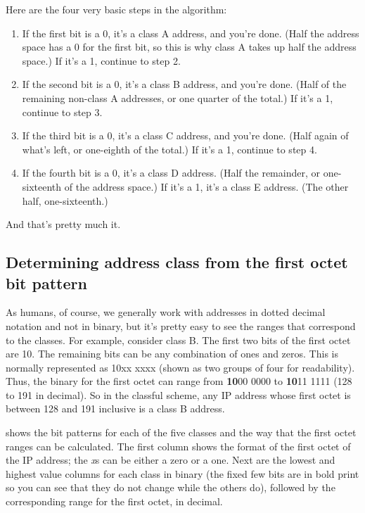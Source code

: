 Here are the four very basic steps in the algorithm:

\begin{enumerate}
   \item
      If the first bit is a 0, it's a class A address, and you're done.
      (Half the address space has a 0 for the first bit, so this is why class A takes up half the address space.)
      If it's a 1, continue to step 2.
   \item
      If the second bit is a 0, it's a class B address, and you're done.
      (Half of the remaining non-class A addresses, or one quarter of the total.)
      If it's a 1, continue to step 3.
   \item
      If the third bit is a 0, it's a class C address, and you're done.
      (Half again of what's left, or one-eighth of the total.) 
      If it's a 1, continue to step 4.
   \item
      If the fourth bit is a 0, it's a class D address.
      (Half the remainder, or one-sixteenth of the address space.) 
      If it's a 1, it's a class E address.
      (The other half, one-sixteenth.)
\end{enumerate}

And that's pretty much it.



\subsection{Determining address class from the first octet bit pattern}

As humans, of course, we generally work with addresses in dotted decimal
notation and not in binary, but it's pretty easy to see the ranges that
correspond to the classes. For example, consider class B. The first two
bits of the first octet are 10. The remaining bits can be any
combination of ones and zeros.
This is normally represented as 10xx xxxx (shown as two groups of four for readability).
Thus, the binary for the first octet can range from {\textbf{10}}00 0000 to {\textbf{10}}11 1111 (128 to 191 in decimal).
So in the classful scheme, any IP address whose first octet is between 128 and 191 inclusive is a class B address.

 shows the bit patterns for each of the five classes and the way that the first octet ranges can be calculated.
The first column shows the format of the first octet of the IP address; the {\emph{x}}s can be either a zero or a one.
Next are the lowest and highest value columns for each class in binary
(the fixed few bits are in bold print so you can see that they do not
change while the others do), followed by the corresponding range for the first octet, in decimal.


